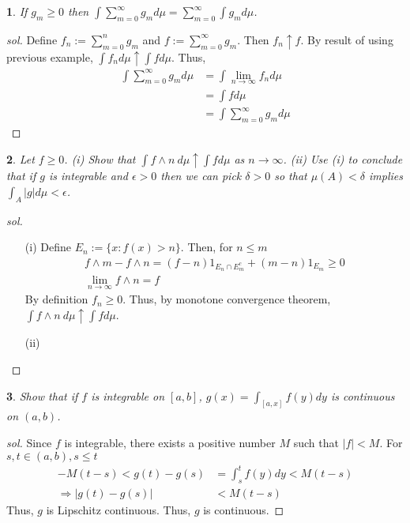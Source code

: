 \documentclass{report}
\newtheorem{ex}{}[section]
\begin{document}
\begin{ex}
If $g_m \ge 0$ then $\int \sum_{m=0}^\infty g_m d\mu = \sum_{m=0}^\infty \int g_m d\mu$.
\end{ex}
\begin{proof}[sol]
Define $f_n := \sum_{m=0}^n g_m$ and $f := \sum_{m=0}^\infty g_m$. Then $f_n \uparrow f$. By result of using previous example, $\int f_nd\mu \uparrow \int fd\mu$. Thus,
\begin{align*}
    \int \sum_{m=0}^\infty g_m d\mu &=\int \lim_{n\to\infty}f_nd\mu\\
    &= \int fd\mu\\
    &= \int \sum_{m=0}^\infty g_md\mu
\end{align*}
\end{proof}
\begin{ex}
Let $f \ge 0$. (i) Show that $\int f \land n \ d\mu \uparrow \int fd\mu$ as $n\to\infty$. (ii) Use (i) to conclude that if $g$ is integrable and $\epsilon > 0$ then we can pick $\delta > 0$ so that $\mu(A) < \delta$ implies $\int_A |g|d\mu < \epsilon$.
\end{ex}
\begin{proof}[sol]~
\begin{enumerate}
    \item[(i)] 
Define $E_n := \{x : f(x) > n\}$. Then, for $n \le m$
\begin{align*}
   f \land m -  f \land n = (f-n) 1_{E_n \cap E_m^c} + (m-n)1_{E_m} \ge 0\\
   \lim_{n\to\infty} f \land n = f
\end{align*}
By definition $f_n \ge 0$. Thus, by monotone convergence theorem, $\int f \land n \ d\mu \uparrow \int fd\mu$.
\item[(ii)] 
\end{enumerate}
\end{proof}
\begin{ex}
Show that if $f$ is integrable on $[a,b]$, $g(x) = \int_{[a,x]}f(y)dy$ is continuous on $(a,b)$.
\end{ex}
\begin{proof}[sol]
Since $f$ is integrable, there exists a positive number $M$ such that $|f| < M$. For $s,t \in (a,b), s\le t$
\begin{align*}
-M(t-s) < g(t) - g(s) &= \int^t_s f(y)dy < M(t-s)\\
\Rightarrow |g(t) - g(s)| &< M(t-s)
\end{align*}
Thus, $g$ is Lipschitz continuous. Thus, $g$ is continuous.
\end{proof}
\end{document}
